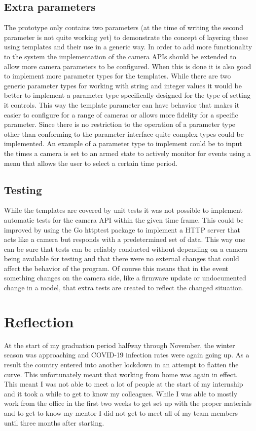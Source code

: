 \section{Extra parameters}
The prototype only contains two parameters (at the time of writing the second parameter is not quite working yet) to demonstrate the concept of layering these using templates and their use in a generic way.
In order to add more functionality to the system the implementation of the camera APIs should be extended to allow more camera parameters to be configured.
When this is done it is also good to implement more parameter types for the templates.
While there are two generic parameter types for working with string and integer values it would be better to implement a parameter type specifically designed for the type of setting it controls.
This way the template parameter can have behavior that makes it easier to configure for a range of cameras or allows more fidelity for a specific parameter.
Since there is no restriction to the operation of a parameter type other than conforming to the parameter interface quite complex types could be implemented.
An example of a parameter type to implement could be to input the times a camera is set to an armed state to actively monitor for events using a menu that allows the user to select a certain time period.

\section{Testing}
While the templates are covered by unit tests it was not possible to implement automatic tests for the camera API within the given time frame.
This could be improved by using the Go httptest package \cite{noauthor_golang_nodate} to implement a HTTP server that acts like a camera but responds with a predetermined set of data.
This way one can be sure that tests can be reliably conducted without depending on a camera being available for testing and that there were no external changes that could affect the behavior of the program.
Of course this means that in the event something changes on the camera side, like a firmware update or undocumented change in a model, that extra tests are created to reflect the changed situation.

\chapter{Reflection}
At the start of my graduation period halfway through November, the winter season was approaching and COVID-19 infection rates were again going up.
As a result the country entered into another lockdown in an attempt to flatten the curve.
This unfortunately meant that working from home was again in effect.
This meant I was not able to meet a lot of people at the start of my internship and it took a while to get to know my colleagues.
While I was able to mostly work from the office in the first two weeks to get set up with the proper materials and to get to know my mentor I did not get to meet all of my team members until three months after starting.


